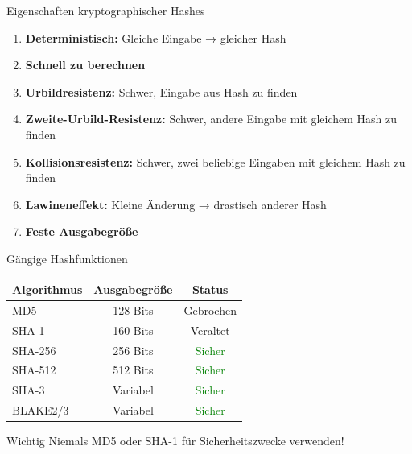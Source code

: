 \documentclass[handout]{beamer}
\begin{document}
\begin{frame}{Eigenschaften kryptographischer Hashes}
\begin{enumerate}
    \item \textbf{Deterministisch:} Gleiche Eingabe → gleicher Hash
    \item \textbf{Schnell zu berechnen}
    \item \textbf{Urbildresistenz:} Schwer, Eingabe aus Hash zu finden
    \item \textbf{Zweite-Urbild-Resistenz:} Schwer, andere Eingabe mit gleichem Hash zu finden
    \item \textbf{Kollisionsresistenz:} Schwer, zwei beliebige Eingaben mit gleichem Hash zu finden
    \item \textbf{Lawineneffekt:} Kleine Änderung → drastisch anderer Hash
    \item \textbf{Feste Ausgabegröße}
\end{enumerate}
\end{frame}

\begin{frame}{Gängige Hashfunktionen}
\begin{center}
\begin{tabular}{|l|c|c|}
\hline
\textbf{Algorithmus} & \textbf{Ausgabegröße} & \textbf{Status} \\
\hline
MD5 & 128 Bits & \alert{Gebrochen} \\
SHA-1 & 160 Bits & \alert{Veraltet} \\
SHA-256 & 256 Bits & \textcolor{green}{Sicher} \\
SHA-512 & 512 Bits & \textcolor{green}{Sicher} \\
SHA-3 & Variabel & \textcolor{green}{Sicher} \\
BLAKE2/3 & Variabel & \textcolor{green}{Sicher} \\
\hline
\end{tabular}
\end{center}

\vspace{0.3cm}
\begin{alertblock}{Wichtig}
Niemals MD5 oder SHA-1 für Sicherheitszwecke verwenden!
\end{alertblock}
\end{frame}
\end{document}
